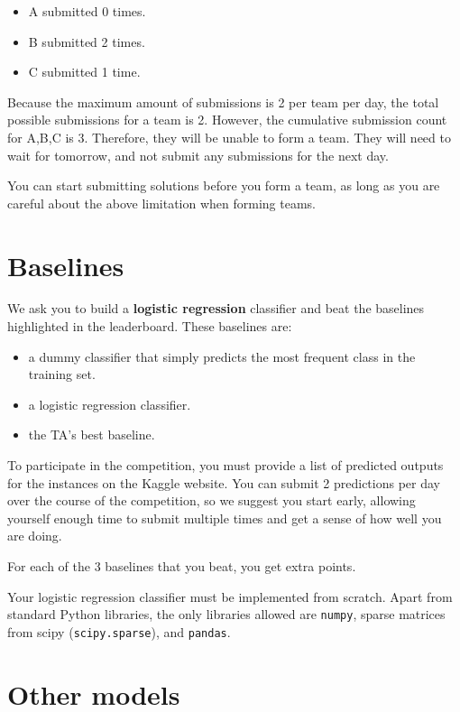 \documentclass[12pt]{article}
\begin{document}
\begin{itemize}
    \item A submitted 0 times.
    \item B submitted 2 times.
    \item C submitted 1 time.
\end{itemize}

Because the maximum amount of submissions is 2 per team per day, the total possible submissions for a team is 2. However, the cumulative submission count for A,B,C is 3. Therefore, they will be unable to form a team. They will need to wait for tomorrow, and not submit any submissions for the next day.

You can start submitting solutions before you form a team, as long as you are careful about the above limitation when forming teams. 


\section{Baselines}
\label{sec:baselines}

We ask you to build a \textbf{logistic regression} classifier and beat the baselines highlighted in the leaderboard. These baselines are:

\begin{itemize}
    \item a dummy classifier that simply predicts the most frequent class in the training set.
    \item a logistic regression classifier.
    \item the TA's best baseline.
\end{itemize}

To participate in the competition, you must provide a list of predicted outputs for the instances on the Kaggle website. You can submit 2 predictions per day over the course of the competition, so we suggest you start early, allowing yourself enough time to submit multiple times and get a sense of how well you are doing.

For each of the 3 baselines that you beat, you get extra points.

Your logistic regression classifier must be implemented from scratch. Apart from standard Python libraries, the only libraries allowed are \texttt{numpy}, sparse matrices from scipy (\texttt{scipy.sparse}), and \texttt{pandas}.

\section{Other models}
 
\end{document}
